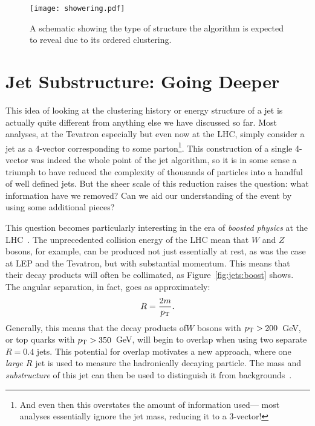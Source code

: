 
\begin{figure}
\centering
\texttt{[image: showering.pdf]}
\label{fig:jets:showering}
\caption{A schematic showing the type of structure the \kt algorithm is expected to reveal due to its \pt ordered clustering.}
\end{figure}



\section{Jet Substructure: Going Deeper}

This idea of looking at the clustering history or energy structure  of a jet is actually quite different from anything else we have discussed so far. Most analyses, at the Tevatron especially but even now at the LHC, simply consider a jet as a 4-vector corresponding to some parton\footnote{And even then this overstates the amount of information used--- most analyses essentially ignore the jet mass, reducing it to a 3-vector!}. This construction of a single 4-vector was indeed the whole point of the jet algorithm, so it is in some sense a triumph to have reduced the complexity of thousands of particles into a handful of well defined jets. But the sheer scale of this reduction raises the question: what information have we removed? Can we aid our understanding of the event by using some additional pieces?

This question becomes particularly interesting in the era of \textit{boosted physics} at the LHC~\cite{Abdesselam:2010pt,Altheimer:2012mn,Altheimer:2013yza,Adams:2015hiv}. The unprecedented collision energy of the LHC mean that $W$ and $Z$ bosons, for example, can be produced not just essentially at rest, as was the case at LEP and the Tevatron, but with substantial momentum. This means that their decay products will often be collimated, as Figure~\ref{fig:jets:boost} shows. The angular separation, in fact, goes as approximately:
%
\begin{equation}
R = \frac{2 m}{p_{\text{T}}}.
\end{equation}
%
Generally, this means that the decay products of$W$ bosons with $p_{\text{T}} > 200$~GeV, or top quarks with $p_{\text{T}} > 350$~GeV, will begin to overlap when using two separate $R=0.4$ jets. This potential for overlap motivates a new approach, where one \textit{large $R$} jet is used to measure the hadronically decaying particle. The mass and \textit{substructure} of this jet can then be used to distinguish it from backgrounds~\cite{Jetography}.

